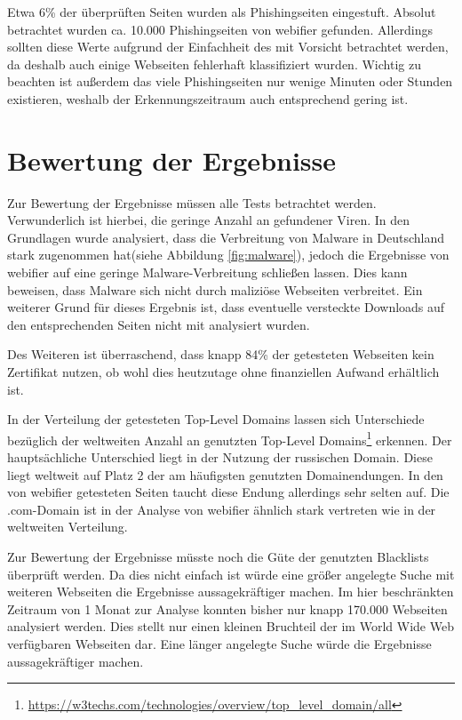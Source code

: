 Etwa 6\% der überprüften Seiten wurden als Phishingseiten eingestuft. Absolut betrachtet wurden ca. 10.000 Phishingseiten von webifier gefunden. Allerdings sollten diese Werte aufgrund der Einfachheit des mit Vorsicht betrachtet werden, da deshalb auch einige Webseiten fehlerhaft klassifiziert wurden. Wichtig zu beachten ist außerdem das viele Phishingseiten nur wenige Minuten oder Stunden existieren, weshalb der Erkennungszeitraum auch entsprechend gering ist.

\section{Bewertung der Ergebnisse}
Zur Bewertung der Ergebnisse müssen alle Tests betrachtet werden. Verwunderlich ist hierbei, die geringe Anzahl an gefundener Viren. In den Grundlagen wurde analysiert, dass die Verbreitung von Malware in Deutschland stark zugenommen hat(siehe Abbildung \ref{fig:malware}), jedoch die Ergebnisse von webifier auf eine geringe Malware-Verbreitung schließen lassen. Dies kann beweisen, dass Malware sich nicht durch maliziöse Webseiten verbreitet. Ein weiterer Grund für dieses Ergebnis ist, dass eventuelle versteckte Downloads auf den entsprechenden Seiten nicht mit analysiert wurden.

Des Weiteren ist überraschend, dass knapp 84\% der getesteten Webseiten kein Zertifikat nutzen, ob wohl dies heutzutage ohne finanziellen Aufwand erhältlich ist.

In der Verteilung der getesteten Top-Level Domains lassen sich Unterschiede bezüglich der weltweiten
Anzahl an genutzten Top-Level
Domains\footnote{\url{https://w3techs.com/technologies/overview/top_level_domain/all}} erkennen. Der
hauptsächliche Unterschied liegt in der Nutzung der russischen Domain. Diese liegt weltweit auf Platz 2 der am häufigsten genutzten Domainendungen. In den von webifier getesteten Seiten taucht diese Endung allerdings sehr selten auf. Die .com-Domain ist in der Analyse von webifier ähnlich stark vertreten wie in der weltweiten Verteilung.

Zur Bewertung der Ergebnisse müsste noch die Güte der genutzten Blacklists überprüft werden. Da dies nicht einfach ist würde eine größer angelegte Suche mit weiteren Webseiten die Ergebnisse aussagekräftiger machen. Im hier beschränkten Zeitraum von 1 Monat zur Analyse konnten bisher nur knapp 170.000 Webseiten analysiert werden. Dies stellt nur einen kleinen Bruchteil der im World Wide Web verfügbaren Webseiten dar. Eine länger angelegte Suche würde die Ergebnisse aussagekräftiger machen.

